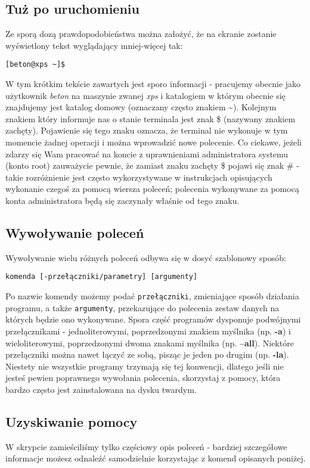 \subsection{Tuż po uruchomieniu}
Ze sporą dozą prawdopodobieństwa można założyć, że na ekranie zostanie wyświetlony tekst wyglądający mniej-więcej tak:
\begin{verbatim}
[beton@xps ~]$ 
\end{verbatim}
W tym krótkim tekście zawartych jest sporo informacji - pracujemy obecnie jako użytkownik \textit{beton} na maszynie zwanej \textit{xps} i katalogiem w którym obecnie się znajdujemy jest katalog domowy (oznaczany często znakiem \textasciitilde). Kolejnym znakiem który informuje nas o stanie terminala jest znak \$ (nazywany znakiem zachęty). Pojawienie się tego znaku oznacza, że terminal nie wykonuje w tym momencie żadnej operacji i można wprowadzić nowe polecenie. Co ciekawe, jeżeli zdarzy się Wam pracować na koncie z uprawnieniami administratora systemu (konto root) zauważycie pewnie, że zamiast znaku zachęty \$ pojawi się znak \# - takie rozróżnienie jest często wykorzystywane w instrukcjach opisujących wykonanie czegoś za pomocą wiersza poleceń; polecenia wykonywane za pomocą konta administratora będą się zaczynały właśnie od tego znaku.

\subsection{Wywoływanie poleceń}
Wywoływanie wielu różnych poleceń odbywa się w dosyć szablonowy sposób:
\begin{verbatim}
komenda [-przełączniki/parametry] [argumenty]
\end{verbatim}
Po nazwie komendy możemy podać \texttt{przełączniki}, zmieniające sposób działania programu, a także \texttt{argumenty}, przekazujące do polecenia zestaw danych na których będzie ono wykonywane. Spora część programów dysponuje podwójnymi przełącznikami - jednoliterowymi, poprzedzonymi znakiem myślnika (np. \textbf{-a}) i wieloliterowymi, poprzedzonymi dwoma znakami myślnika (np. \textbf{--all}). Niektóre przełączniki można nawet łączyć ze sobą, pisząc je jeden po drugim (np. \textbf{-la}). Niestety nie wszystkie programy trzymają się tej konwencji, dlatego jeśli nie jesteś pewien poprawnego wywołania polecenia, skorzystaj z pomocy, która bardzo często jest zainstalowana na dysku twardym.

\subsection{Uzyskiwanie pomocy}
W skrypcie zamieściliśmy tylko częściowy opis poleceń - bardziej szczegółowe informacje możesz odnaleźć samodzielnie korzystając z komend opisanych poniżej.

